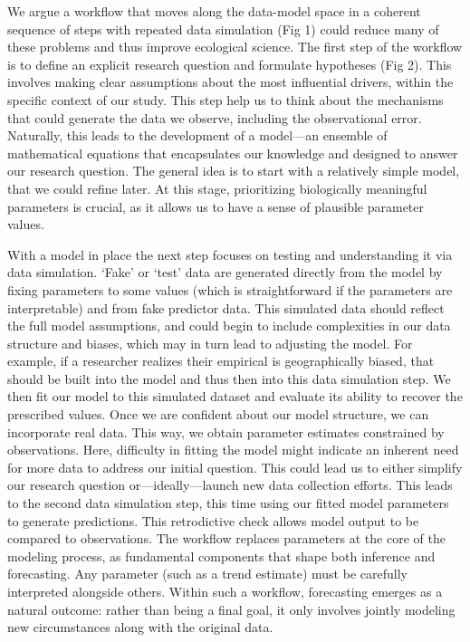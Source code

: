 \documentclass[11pt]{article}
\begin{document}
We argue a workflow that moves along the data-model space in a coherent sequence of steps with repeated data simulation (Fig 1) could reduce many of these problems and thus improve ecological science.
The first step of the workflow is to define an explicit research question and formulate hypotheses (Fig 2). This involves making clear assumptions about the most influential drivers, within the specific context of our study. This step help us to think about the mechanisms that could generate the data we observe, including the observational error. Naturally, this leads to the development of a model---an ensemble of mathematical equations that encapsulates our knowledge and designed to answer our research question. The general idea is to start with a relatively simple model, that we could refine later. At this stage, prioritizing biologically meaningful parameters is crucial, as it allows us to have a sense of plausible parameter values. 

With a model in place the next step focuses on testing and understanding it via data simulation. `Fake' or `test' data are generated directly from the model by fixing parameters to some values (which is straightforward if the parameters are interpretable) and from fake predictor data. This simulated data should reflect the full model assumptions, and could begin to include complexities in our data structure and biases, which may in turn lead to adjusting the model. For example, if a researcher realizes their empirical is geographically biased, that should be built into the model and thus then into this data simulation step. 
We then fit our model to this simulated dataset and evaluate its ability to recover the prescribed values. 
Once we are confident about our model structure, we can incorporate real data. This way, we obtain parameter estimates constrained by observations. Here, difficulty in fitting the model might indicate an inherent need for more data to address our initial question. This could lead us to either simplify our research question or---ideally---launch new data collection efforts. This leads to the second data simulation step, this time using our fitted model parameters to generate predictions. This retrodictive check allows model output to be compared to observations. 
The workflow replaces parameters at the core of the modeling process, as fundamental components that shape both inference and forecasting. Any parameter (such as a trend estimate) must be carefully interpreted alongside others. %
Within such a workflow, forecasting emerges as a natural outcome: rather than being a final goal, it only involves jointly modeling new circumstances along with the original data.
\end{document}
